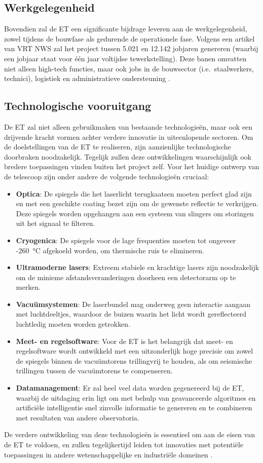 \subsection{Werkgelegenheid}
Bovendien zal de ET een significante bijdrage leveren aan de werkgelegenheid, zowel tijdens de bouwfase als gedurende de operationele fase. Volgens een artikel van VRT NWS zal het project tussen 5.021 en 12.142 jobjaren genereren (waarbij een jobjaar staat voor één jaar voltijdse tewerkstelling). Deze banen omvatten niet alleen high-tech functies, maar ook jobs in de bouwsector (i.e.\ staalwerkers, technici), logistiek en administratieve ondersteuning \autocite{VRTNWS2025}.

\subsection{Technologische vooruitgang}
De ET zal niet alleen gebruikmaken van bestaande technologieën, maar ook een drijvende kracht vormen achter verdere innovatie in uiteenlopende sectoren. Om de doelstellingen van de ET te realiseren, zijn aanzienlijke technologische doorbraken noodzakelijk. Tegelijk zullen deze ontwikkelingen waarschijnlijk ook bredere toepassingen vinden buiten het project zelf. Voor het huidige ontwerp van de telescoop zijn onder andere de volgende technologieën cruciaal:
\begin{itemize}
    \item \textbf{Optica}: De spiegels die het laserlicht terugkaatsen moeten perfect glad zijn en met een geschikte coating bezet zijn om de gewenste reflectie te verkrijgen. Deze spiegels worden opgehangen aan een systeem van slingers om storingen uit het signaal te filteren.
    \item \textbf{Cryogenica}: De spiegels voor de lage frequenties moeten tot ongeveer -260~°C afgekoeld worden, om thermische ruis te elimineren.
    \item \textbf{Ultramoderne lasers}: Extreem stabiele en krachtige lasers zijn noodzakelijk om de minieme afstandsveranderingen doorheen een detectorarm op te merken.
    \item \textbf{Vacuümsystemen}: De laserbundel mag onderweg geen interactie aangaan met luchtdeeltjes, waardoor de buizen waarin het licht wordt gereflecteerd luchtledig moeten worden getrokken.
    \item \textbf{Meet- en regelsoftware}: Voor de ET is het belangrijk dat meet- en regelsoftware wordt ontwikkeld met een uitzonderlijk hoge precisie om zowel de spiegels binnen de vacuümtorens trillingvrij te houden, als om seismische trillingen tussen de vacuümtorens te compenseren.
    \item \textbf{Datamanagement}: Er zal heel veel data worden gegenereerd bij de ET, waarbij de uitdaging erin ligt om met behulp van geavanceerde algoritmes en artificiële intelligentie snel zinvolle informatie te genereren en te combineren met resultaten van andere observatoria.
\end{itemize}
De verdere ontwikkeling van deze technologieën is essentieel om aan de eisen van de ET te voldoen, en zullen tegelijkertijd leiden tot innovaties met potentiële toepassingen in andere wetenschappelijke en industriële domeinen \autocite{ortelius2025socio}.

